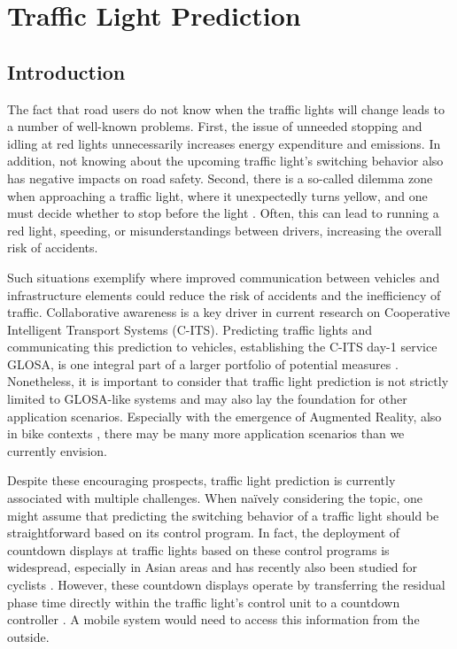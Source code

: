 \chapter{Traffic Light Prediction}\label{ch:prediction}

\section{Introduction}

The fact that road users do not know when the traffic lights will change leads to a number of well-known problems. First, the issue of unneeded stopping and idling at red lights unnecessarily increases energy expenditure and emissions. In addition, not knowing about the upcoming traffic light's switching behavior also has negative impacts on road safety. Second, there is a so-called dilemma zone when approaching a traffic light, where it unexpectedly turns yellow, and one must decide whether to stop before the light \cite{zhang_yellow_2014, suzuki_new_2018}. Often, this can lead to running a red light, speeding, or misunderstandings between drivers, increasing the overall risk of accidents.

Such situations exemplify where improved communication between vehicles and infrastructure elements could reduce the risk of accidents and the inefficiency of traffic. Collaborative awareness is a key driver in current research on Cooperative Intelligent Transport Systems (C-ITS). Predicting traffic lights and communicating this prediction to vehicles, establishing the C-ITS day-1 service GLOSA, is one integral part of a larger portfolio of potential measures \cite{mellegard_day_2020}. Nonetheless, it is important to consider that traffic light prediction is not strictly limited to GLOSA-like systems and may also lay the foundation for other application scenarios. Especially with the emergence of Augmented Reality, also in bike contexts \cite{matviienko_bikear_2022, kosch_notibike_2022}, there may be many more application scenarios than we currently envision.

Despite these encouraging prospects, traffic light prediction is currently associated with multiple challenges. When naïvely considering the topic, one might assume that predicting the switching behavior of a traffic light should be straightforward based on its control program. In fact, the deployment of countdown displays at traffic lights based on these control programs is widespread, especially in Asian areas \cite{pan_impact_2023} and has recently also been studied for cyclists \cite{kaths_green_2019}. However, these countdown displays operate by transferring the residual phase time directly within the traffic light's control unit to a countdown controller \cite{islam_improved_2016}. A mobile system would need to access this information from the outside.

